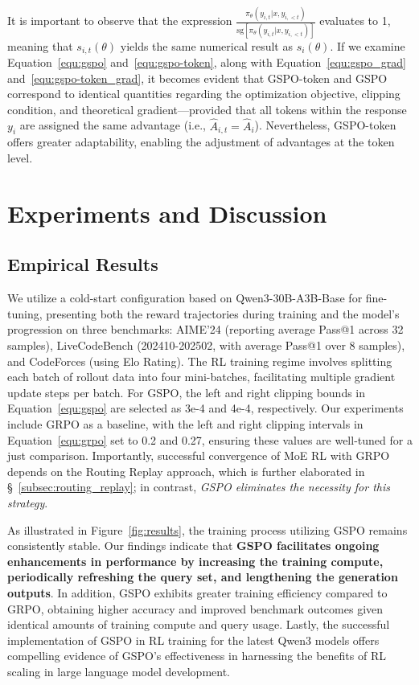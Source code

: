 It is important to observe that the expression $\frac{ \pi_{\theta} (y_{i,t} | x, y_{i,<t}) }{ \mathrm{sg} \left[ \pi_{\theta} (y_{i,t} | x, y_{i,<t}) \right] }$ evaluates to 1, meaning that $s_{i,t}(\theta)$ yields the same numerical result as $s_{i}(\theta)$. If we examine Equation~\eqref{equ:gspo} and~\eqref{equ:gspo-token}, along with Equation~\eqref{equ:gspo_grad} and~\eqref{equ:gspo-token_grad}, it becomes evident that GSPO-token and GSPO correspond to identical quantities regarding the optimization objective, clipping condition, and theoretical gradient—provided that all tokens within the response $y_i$ are assigned the same advantage (i.e., $\widehat{A}_{i,t} = \widehat{A}_{i}$). Nevertheless, GSPO-token offers greater adaptability, enabling the adjustment of advantages at the token level.

\section{Experiments and Discussion}

\subsection{Empirical Results}

We utilize a cold-start configuration based on Qwen3-30B-A3B-Base for fine-tuning, presenting both the reward trajectories during training and the model’s progression on three benchmarks: AIME'24 (reporting average Pass@1 across 32 samples), LiveCodeBench (202410-202502, with average Pass@1 over 8 samples), and CodeForces (using Elo Rating). The RL training regime involves splitting each batch of rollout data into four mini-batches, facilitating multiple gradient update steps per batch. For GSPO, the left and right clipping bounds in Equation~\eqref{equ:gspo} are selected as 3e-4 and 4e-4, respectively. Our experiments include GRPO as a baseline, with the left and right clipping intervals in Equation~\eqref{equ:grpo} set to 0.2 and 0.27, ensuring these values are well-tuned for a just comparison. Importantly, successful convergence of MoE RL with GRPO depends on the Routing Replay approach, which is further elaborated in \S~\ref{subsec:routing_replay}; in contrast, \textit{GSPO eliminates the necessity for this strategy}.

As illustrated in Figure~\ref{fig:results}, the training process utilizing GSPO remains consistently stable. Our findings indicate that \textbf{GSPO facilitates ongoing enhancements in performance by increasing the training compute, periodically refreshing the query set, and lengthening the generation outputs}. In addition, GSPO exhibits greater training efficiency compared to GRPO, obtaining higher accuracy and improved benchmark outcomes given identical amounts of training compute and query usage. Lastly, the successful implementation of GSPO in RL training for the latest Qwen3 models offers compelling evidence of GSPO's effectiveness in harnessing the benefits of RL scaling in large language model development.

